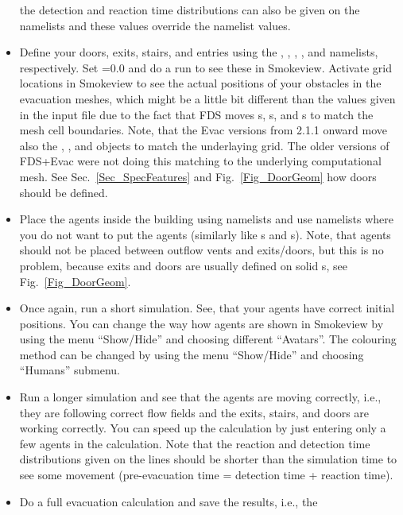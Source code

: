 \documentclass[12pt,a4paper,final,twoside]{stylevk}
\begin{document}
\begin{itemize}
  the detection and reaction time distributions can also be given on
  the  namelists and these values override the
   namelist values.
%
\item Define your doors, exits, stairs, and entries using the
  , , , , and
   namelists, respectively.  Set =0.0 and do
  a run to see these in Smokeview.  Activate grid locations in
  Smokeview to see the actual positions of your obstacles in the
  evacuation meshes, which might be a little bit different than the
  values given in the input file due to the fact that FDS moves
  s, s, and s to match the mesh
  cell boundaries.  Note, that the Evac versions from 2.1.1 onward
  move also the , , and  objects
  to match the underlaying grid.  The older versions of FDS+Evac were
  not doing this matching to the underlying computational mesh.  See
  Sec.~\ref{Sec_SpecFeatures} and Fig.~\ref{Fig_DoorGeom} how doors
  should be defined.
%
\item Place the agents inside the building using 
  namelists and use  namelists where you do not want to
  put the agents (similarly like s and s).
  Note, that agents should not be placed between outflow vents and
  exits/doors, but this is no problem, because exits and doors are
  usually defined on solid s, see
  Fig.~\ref{Fig_DoorGeom}.
%
\item Once again, run a short simulation.  See, that your agents have
  correct initial positions.  You can change the way how agents are
  shown in Smokeview by using the menu ``Show/Hide'' and choosing
  different ``Avatars''.  The colouring method can be changed by using
  the menu ``Show/Hide'' and choosing ``Humans'' submenu.
%
\item Run a longer simulation and see that the agents are moving
  correctly, i.e., they are following correct flow fields and
  the exits, stairs, and doors are working correctly.  You can speed
  up the calculation by just entering only a few agents in the
  calculation.  Note that the reaction and detection time
  distributions given on the  lines should be shorter than
  the simulation time to see some movement (pre-evacuation time =
  detection time + reaction time).
%
\item Do a full evacuation calculation and save the results,
  i.e., the  

\end{itemize}
\end{document}
